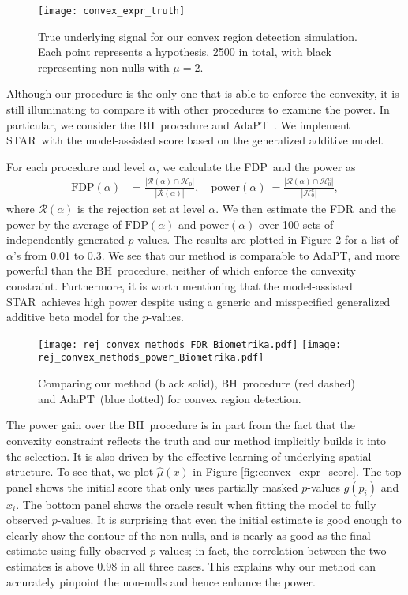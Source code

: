 \documentclass{biometrika}
\newcommand{\cH}{\mathcal{H}}
\newcommand{\cR}{\mathcal{R}}
\newcommand{\textFDP}{FDP}
\newcommand{\textFDR}{FDR}
\renewcommand{\star}{STAR}
\newcommand{\adapt}{AdaPT}
\newcommand{\bh}{BH}
\newcommand{\1}{\mathbf{1}}
\begin{document}
\begin{figure}
  \centering
  \texttt{[image: convex\_expr\_truth]}
  \caption{True underlying signal for our convex region detection simulation. Each point represents a hypothesis, 2500 in total, with black representing non-nulls with $\mu = 2$.}\label{fig:convex_expr_truth}
\end{figure}

Although our procedure is the only one that is able to enforce the convexity, it is still illuminating to compare it with other procedures to examine the power. In particular, we consider the \bh ~procedure \citep{bh95} and \adapt ~\citep{lei2018adapt}. We implement \star ~with the model-assisted score based on the generalized additive model. 

For each procedure and level $\alpha$, we calculate the \textFDP ~and the power as
\begin{align}\label{eq:defs}
\mathrm{FDP}(\alpha) &= \frac{|\cR(\alpha)\cap \cH_{0}|}{|\cR(\alpha)|}, \quad \mathrm{power}(\alpha) ~= \frac{|\cR(\alpha)\cap \cH_{0}^{c}|}{|\cH_{0}^{c}|},
\end{align}
where $\cR(\alpha)$ is the rejection set at level $\alpha$. We then estimate the \textFDR ~and the power by the average of $\mathrm{FDP}(\alpha)$ and $\mathrm{power}(\alpha)$ over 100 sets of independently generated $p$-values. The results are plotted in Figure \ref{fig:rej_convex_methods} for a list of $\alpha$'s from 0.01 to 0.3. We see that our method is comparable to \adapt, and more powerful than the \bh ~procedure, neither of which enforce the convexity constraint. Furthermore, it is worth mentioning that the model-assisted \star ~achieves high power despite using a generic and misspecified generalized additive beta model for the $p$-values.

\begin{figure}[h]
  \centering
  \texttt{[image: rej\_convex\_methods\_FDR\_Biometrika.pdf]}
  \texttt{[image: rej\_convex\_methods\_power\_Biometrika.pdf]}
  \caption{Comparing our method (black solid), \bh ~procedure (red dashed) and \adapt ~(blue dotted) for convex region detection.}\label{fig:rej_convex_methods}
\end{figure}

The power gain over the \bh ~procedure is in part from the fact that the convexity constraint reflects the truth and our method implicitly builds it into the selection. It is also driven by the effective learning of underlying spatial structure. To see that, %
we plot $\hat{\mu}(x)$ in Figure \ref{fig:convex_expr_score}. The top panel shows the initial score that only uses partially masked $p$-values $g(p_i)$ and $x_i$. The bottom panel shows the oracle result when fitting the model to fully observed $p$-values. It is surprising that even the initial estimate is good enough to clearly show the contour of the non-nulls, and is nearly as good as the final estimate using fully observed $p$-values; in fact, the correlation between the two estimates is above 0.98 in all three cases. This explains why our method can accurately pinpoint the non-nulls and hence enhance the power.
\end{document}
